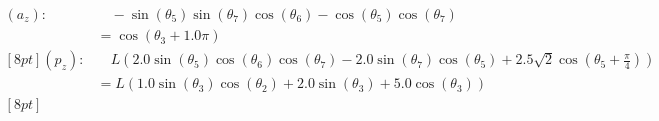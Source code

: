 \documentclass[12pt, a4paper]{article}
\begin{document}
\begin{align}
(a_{z}): & \quad - \sin{\left(\theta_{5} \right)} \sin{\left(\theta_{7} \right)} \cos{\left(\theta_{6} \right)} - \cos{\left(\theta_{5} \right)} \cos{\left(\theta_{7} \right)} \\ 
&= \cos{\left(\theta_{3} + 1.0 \pi \right)} \\ [8pt] 
(p_{z}): & \quad L \left(2.0 \sin{\left(\theta_{5} \right)} \cos{\left(\theta_{6} \right)} \cos{\left(\theta_{7} \right)} - 2.0 \sin{\left(\theta_{7} \right)} \cos{\left(\theta_{5} \right)} + 2.5 \sqrt{2} \cos{\left(\theta_{5} + \frac{\pi}{4} \right)}\right) \\ 
&= L \left(1.0 \sin{\left(\theta_{3} \right)} \cos{\left(\theta_{2} \right)} + 2.0 \sin{\left(\theta_{3} \right)} + 5.0 \cos{\left(\theta_{3} \right)}\right) \\ [8pt] 
\end{align}

\newpage
\end{document}
